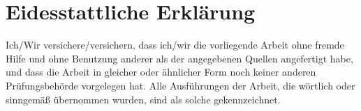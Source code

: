 \thispagestyle{empty}
\section*{Eidesstattliche Erklärung}
Ich/Wir versichere/versichern, dass ich/wir die vorliegende Arbeit ohne fremde Hilfe und ohne Benutzung anderer als der angegebenen Quellen angefertigt habe, und dass die Arbeit in gleicher oder ähnlicher Form noch keiner anderen Prüfungsbehörde vorgelegen hat. Alle Ausführungen der Arbeit, die wörtlich oder sinngemäß übernommen wurden, sind als solche gekennzeichnet.\\
\linebreak
\linebreak
{}
